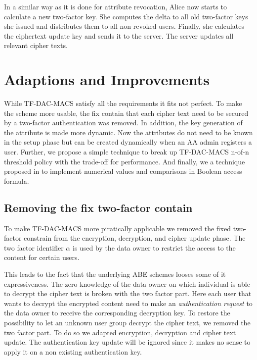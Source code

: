 In a similar way as it is done for attribute revocation, Alice now starts to calculate a new two-factor key. She computes the delta to all old two-factor keys she issued and distributes them to all non-revoked users. Finally, she calculates the ciphertext update key and sends it to the server. The server updates all relevant cipher texts.

\section{Adaptions and Improvements}
While TF-DAC-MACS satisfy all the requirements it fits not perfect. To make the scheme more usable, the fix contain that each cipher text need to be secured by a two-factor authentication was removed. In addition, the key generation of the attribute is made more dynamic. Now the attributes do not need to be known in the setup phase but can be created dynamically when an AA admin registers a user. Further, we propose a simple technique to break up TF-DAC-MACS n-of-n threshold policy with the trade-off for performance. And finally, we a technique proposed in \cite{bethencourt2007ciphertext} to implement numerical values and comparisons in Boolean access formula. 

\subsection{Removing the fix two-factor contain}
To make \ac{TF-DAC-MACS} more piratically applicable we removed the fixed two-factor constrain from the encryption, decryption, and cipher update phase. The two factor identifier $\alpha$ is used by the data owner to restrict the access to the content for certain users. 

This leads to the fact that the underlying \ac{ABE} schemes looses some of it expressiveness. The zero knowledge of the data owner on which individual is able to decrypt the cipher text is broken with the two factor part. Here each user that wants to decrypt the encrypted content need to make an \textit{authentication request} to the data owner to receive the corresponding decryption key. To restore the possibility to let an unknown user group decrypt the cipher text, we removed the two factor part. To do so we adapted encryption, decryption and cipher text update. The authentication key update will be ignored since it makes no sense to apply it on a non existing authentication key. 

